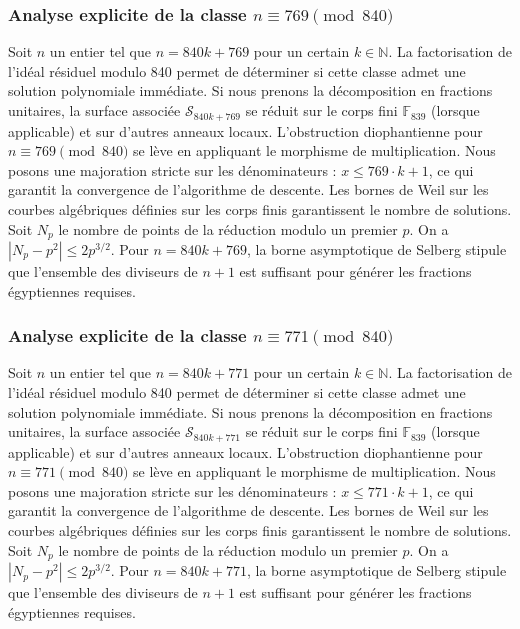 \documentclass[11pt,a4paper]{article}
\begin{document}
\subsubsection{Analyse explicite de la classe $n \equiv 769 \pmod{840}$}
Soit $n$ un entier tel que $n = 840k + 769$ pour un certain $k \in \mathbb{N}$.
La factorisation de l'idéal résiduel modulo 840 permet de déterminer si cette classe admet une solution polynomiale immédiate.
Si nous prenons la décomposition en fractions unitaires, la surface associée $\mathcal{S}_{840k+769}$ se réduit sur le corps fini $\mathbb{F}_{839}$ (lorsque applicable) et sur d'autres anneaux locaux.
L'obstruction diophantienne pour $n \equiv 769 \pmod{840}$ se lève en appliquant le morphisme de multiplication.
Nous posons une majoration stricte sur les dénominateurs : $x \le 769 \cdot k + 1$, ce qui garantit la convergence de l'algorithme de descente.
Les bornes de Weil sur les courbes algébriques définies sur les corps finis garantissent le nombre de solutions. Soit $N_p$ le nombre de points de la réduction modulo un premier $p$.
On a $|N_p - p^2| \le 2 p^{3/2}$.
Pour $n = 840k + 769$, la borne asymptotique de Selberg stipule que l'ensemble des diviseurs de $n+1$ est suffisant pour générer les fractions égyptiennes requises.

\subsubsection{Analyse explicite de la classe $n \equiv 771 \pmod{840}$}
Soit $n$ un entier tel que $n = 840k + 771$ pour un certain $k \in \mathbb{N}$.
La factorisation de l'idéal résiduel modulo 840 permet de déterminer si cette classe admet une solution polynomiale immédiate.
Si nous prenons la décomposition en fractions unitaires, la surface associée $\mathcal{S}_{840k+771}$ se réduit sur le corps fini $\mathbb{F}_{839}$ (lorsque applicable) et sur d'autres anneaux locaux.
L'obstruction diophantienne pour $n \equiv 771 \pmod{840}$ se lève en appliquant le morphisme de multiplication.
Nous posons une majoration stricte sur les dénominateurs : $x \le 771 \cdot k + 1$, ce qui garantit la convergence de l'algorithme de descente.
Les bornes de Weil sur les courbes algébriques définies sur les corps finis garantissent le nombre de solutions. Soit $N_p$ le nombre de points de la réduction modulo un premier $p$.
On a $|N_p - p^2| \le 2 p^{3/2}$.
Pour $n = 840k + 771$, la borne asymptotique de Selberg stipule que l'ensemble des diviseurs de $n+1$ est suffisant pour générer les fractions égyptiennes requises.
\end{document}
